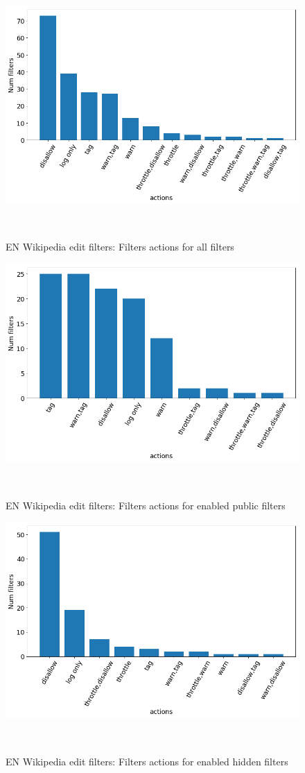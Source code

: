 \begin{figure}
\centering
  \includegraphics[width=0.9\columnwidth]{pics/all-active-filters-actions.png}
  \caption{EN Wikipedia edit filters: Filters actions for all filters}~\label{fig:all-active-filters-actions}
\end{figure}

\begin{figure}
\centering
  \includegraphics[width=0.9\columnwidth]{pics/active-public-actions-big.png}
  \caption{EN Wikipedia edit filters: Filters actions for enabled public filters}~\label{fig:active-public-actions}
\end{figure}

\begin{figure}
\centering
  \includegraphics[width=0.9\columnwidth]{pics/active-hidden-actions-big.png}
  \caption{EN Wikipedia edit filters: Filters actions for enabled hidden filters}~\label{fig:active-hidden-actions}
\end{figure}


